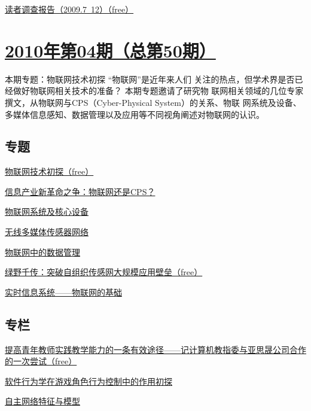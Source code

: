 \documentclass[a4paper]{article}
\begin{document}
\href{http://history.ccf.org.cn/resources/1190201776262/2010/05/13/201005-17tebiebaodao-free.pdf}{读者调查报告（2009.7~12）（free）}


\section{\href{http://history.ccf.org.cn/sites/ccf/jsjtbbd.jsp?contentId=2543828071575}{\textbf{2010年第04期（总第50期）}}}
本期专题：物联网技术初探 “物联网”是近年来人们
关注的热点，但学术界是否已经做好物联网相关技术的准备？ 本期专题邀请了研究物
联网相关领域的几位专家撰文，从物联网与CPS（Cyber-Physical System）的关系、物联
网系统及设备、多媒体信息感知、数据管理以及应用等不同视角阐述对物联网的认识。
\subsection{专题}
\href{http://history.ccf.org.cn/resources/1190201776262/2010/04/23/201004-1free.pdf}{物联网技术初探（free）}

\href{http://history.ccf.org.cn/resources/1190201776262/2010/04/23/201004-2.pdf}{信息产业新革命之争：物联网还是CPS？}

\href{http://history.ccf.org.cn/resources/1190201776262/2010/04/23/201004-3.pdf}{物联网系统及核心设备}

\href{http://history.ccf.org.cn/resources/1190201776262/2010/04/23/201004-4.pdf}{无线多媒体传感器网络}

\href{http://history.ccf.org.cn/resources/1190201776262/2010/04/23/201004-5.pdf}{物联网中的数据管理}

\href{http://history.ccf.org.cn/resources/1190201776262/2010/04/23/201004-6free.pdf}{绿野千传：突破自组织传感网大规模应用壁垒（free）}

\href{http://history.ccf.org.cn/resources/1190201776262/2010/04/23/201004-7.pdf}{实时信息系统——物联网的基础}

\subsection{专栏}
\href{http://history.ccf.org.cn/resources/1190201776262/2010/04/23/201004-8.pdf}{提高青年教师实践教学能力的一条有效途径——记计算机教指委与亚思晟公司合作的一次尝试（free）}

\href{http://history.ccf.org.cn/resources/1190201776262/2010/04/23/201004-9.pdf}{软件行为学在游戏角色行为控制中的作用初探}

\href{http://history.ccf.org.cn/resources/1190201776262/2010/04/23/201004-10.pdf}{自主网络特征与模型}
\end{document}
